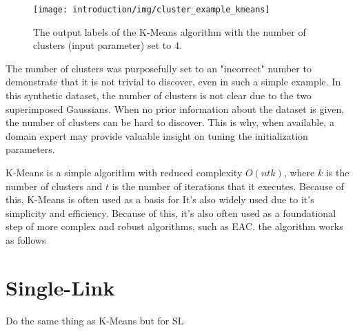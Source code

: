 \begin{figure}[hbtp]
\centering
\texttt{[image: introduction/img/cluster\_example\_kmeans]}
\caption{The output labels of the K-Means algorithm with the number of clusters (input parameter) set to 4.}
\label{fig:intro kmeans}\end{figure}

The number of clusters was purposefully set to an "incorrect" number to demonstrate that it is not trivial to discover, even in such a simple example.
In this synthetic dataset, the number of clusters is not clear due to the two superimposed Gaussians.
When no prior information about the dataset is given, the number of clusters can be hard to discover.
This is why, when available, a domain expert may provide valuable insight on tuning the initialization parameters.

K-Means is a simple algorithm with reduced complexity $O(ntk)$, where $k$ is the number of clusters and $t$ is the number of iterations that it executes.
Because of this, K-Means is often used as a basis for 
It's also widely used due to it's simplicity and efficiency.
Because of this, it's also often used as a foundational step of more complex and robust algorithms, such as EAC.
 the algorithm works as follows

\section{Single-Link}

Do the same thing as K-Means but for SL